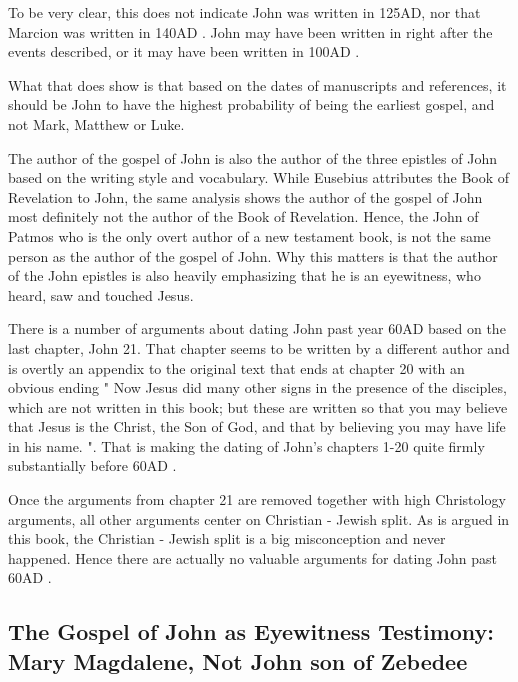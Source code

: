 To be very clear, this does not indicate John was written in 125AD, nor that Marcion was written in 140AD .
John may have been written in right after the events described, or it may have been written in 100AD .

What that does show is that based on the dates of manuscripts and references, it should be John to have the highest probability of being the earliest gospel, and not Mark, Matthew or Luke.

The author of the gospel of John is also the author of the three epistles of John based on the writing style and vocabulary.
While Eusebius attributes the Book of Revelation to John, the same analysis shows the author of the gospel of John most definitely not the author of the Book of Revelation.
Hence, the John of Patmos who is the only overt author of a new testament book, is not the same person as the author of the gospel of John.
Why this matters is that the author of the John epistles is also heavily emphasizing that he is an eyewitness, who heard, saw and touched Jesus.

There is a number of arguments about dating John past year 60AD based on the last chapter, John 21.
That chapter seems to be written by a different author and is overtly an appendix to the original text that ends at chapter 20 with an obvious ending "
Now Jesus did many other signs in the presence of the disciples, which are not written in this book;
but these are written so that you may believe that Jesus is the Christ, the Son of God, and that by believing you may have life in his name.
".
That is making the dating of John's chapters 1-20 quite firmly substantially before 60AD .

Once the arguments from chapter 21 are removed together with high Christology arguments, all other arguments center on Christian - Jewish split.
As is argued in this book, the Christian - Jewish split is a big misconception and never happened.
Hence there are actually no valuable arguments for dating John past 60AD .

\subsection{The Gospel of John as Eyewitness Testimony: Mary Magdalene, Not John son of Zebedee}\label{subsec:the-gospel-of-john-is-widely-accepted-to-be-one-gospel-that-indicates-it-was-written-by-an-eyewitness.}

